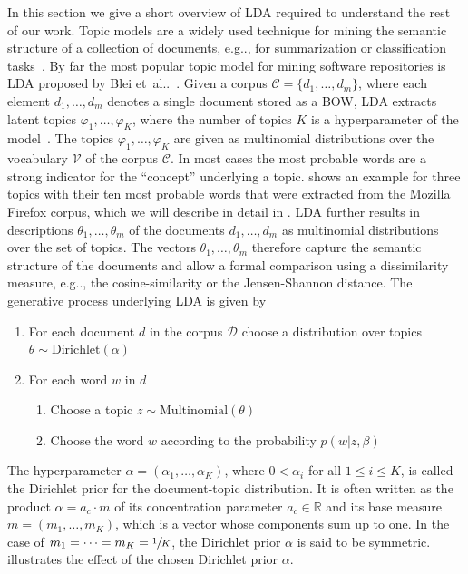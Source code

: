 \documentclass[a4paper,twoside]{article}
\makeatletter
\DeclareRobustCommand\onedot{\futurelet\@let@token\@onedot}
\def\@onedot{\ifx\@let@token.\else.\null\fi\xspace}
\def\etal{et~al\onedot}
\def\eg{e.g\onedot,\xspace}
\makeatother
\begin{document}
In this section we give a short overview of \ac{LDA} required to understand the rest of our work.
Topic models are a widely used technique for mining the semantic structure of a collection of documents, \eg for summarization or classification tasks~\cite{aggarwal2012mining}.
By far the most popular topic model for mining software repositories is \ac{LDA} proposed by Blei \etal~\cite{chen2016survey,Sun2016ExploringSurvey}.
Given a corpus $\mathcal{C} = \{d_1, \dots, d_m\}$, where each element $d_1, \dots, d_m$ denotes a single document stored as a \ac{BOW}, \ac{LDA} extracts latent topics $\varphi_1, \dots, \varphi_K$, where the number of topics $K$ is a hyperparameter of the model~\cite{blei2003latent}.
The topics $\varphi_1, \dots, \varphi_K$ are given as multinomial distributions over the vocabulary $\mathcal{V}$ of the corpus $\mathcal{C}$.
In most cases the most probable words are a strong indicator for the \enquote{concept} underlying a topic.
 shows an example for three topics with their ten most probable words that were extracted from the Mozilla Firefox corpus, which we will describe in detail in .
\ac{LDA} further results in descriptions $\theta_1, \dots, \theta_m$ of the documents $d_1, \dots, d_m$ as multinomial distributions over the set of topics.
The vectors $\theta_1, \dots, \theta_m$ therefore capture the semantic structure of the documents and allow a formal comparison using a dissimilarity measure, \eg the cosine-similarity or the Jensen-Shannon distance.
The generative process underlying \ac{LDA} is given by


\begin{enumerate}
    \item For each document $d$ in the corpus $\mathcal{D}$ choose a distribution over topics $\theta \sim \text{Dirichlet}(\alpha)$
    \item For each word $w$ in $d$
    \begin{enumerate}
        \item Choose a topic $z \sim \text{Multinomial}(\theta)$
        \item Choose the word $w$ according to the probability $p(w \vert z, \beta)$
    \end{enumerate}
\end{enumerate}

The hyperparameter $\alpha = (\alpha_1, \dots, \alpha_K)$, where $0 < \alpha_i$ for all $1\le i \le K$, is called the Dirichlet prior for the document-topic distribution.
It is often written as the product $\alpha = a_c \cdot m$ of its concentration parameter $a_c \in \mathbb{R}$ and its base measure $m = (m_1, \dots, m_K)$, which is a vector whose components sum up to one.
In the case of $m_1 = \dots = m_K = \sfrac{1}{K}$, the Dirichlet prior $\alpha$ is said to be symmetric.
 illustrates the effect of the chosen Dirichlet prior $\alpha$.
\end{document}
